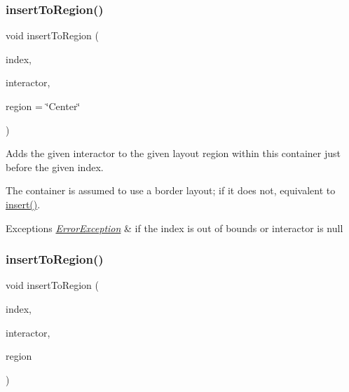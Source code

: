 \subsubsection{\texorpdfstring{insert\+To\+Region()}{insertToRegion()}\hspace{0.1cm}{\footnotesize\ttfamily [2/4]}}
{\footnotesize\ttfamily void insert\+To\+Region (\begin{DoxyParamCaption}\item[{int}]{index,  }\item[{\mbox{\hyperlink{classGInteractor}{G\+Interactor}} $\ast$}]{interactor,  }\item[{const std\+::string \&}]{region = {\ttfamily \char`\"{}Center\char`\"{}} }\end{DoxyParamCaption})\hspace{0.3cm}{\ttfamily [virtual]}}



Adds the given interactor to the given layout region within this container just before the given index. 

The container is assumed to use a border layout; if it does not, equivalent to \mbox{\hyperlink{classGContainer_afffb8f789ff9a8466fbae5b846a0ebe7}{insert()}}. 
\begin{DoxyExceptions}{Exceptions}
{\em \mbox{\hyperlink{classErrorException}{Error\+Exception}}} & if the index is out of bounds or interactor is null \\
\hline
\end{DoxyExceptions}
\mbox{\label{classGContainer_a1be2b263cd8d28e61e136a19d8e935cc}} 
\subsubsection{\texorpdfstring{insert\+To\+Region()}{insertToRegion()}\hspace{0.1cm}{\footnotesize\ttfamily [3/4]}}
{\footnotesize\ttfamily void insert\+To\+Region (\begin{DoxyParamCaption}\item[{int}]{index,  }\item[{\mbox{\hyperlink{classGInteractor}{G\+Interactor}} \&}]{interactor,  }\item[{\mbox{\hyperlink{classGContainer_a81a01a86de31071a92e6cce0bab9bc4b}{Region}}}]{region }\end{DoxyParamCaption})\hspace{0.3cm}{\ttfamily [virtual]}}



